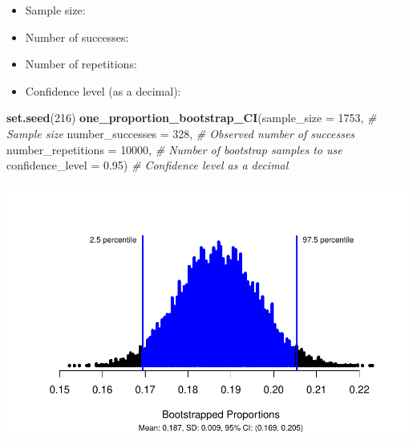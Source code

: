 \documentclass[
]{report}
\newenvironment{Shaded}{\begin{snugshade}}{\end{snugshade}}
\newcommand{\AttributeTok}[1]{\textcolor[rgb]{0.13,0.29,0.53}{#1}}
\newcommand{\CommentTok}[1]{\textcolor[rgb]{0.56,0.35,0.01}{\textit{#1}}}
\newcommand{\DecValTok}[1]{\textcolor[rgb]{0.00,0.00,0.81}{#1}}
\newcommand{\FloatTok}[1]{\textcolor[rgb]{0.00,0.00,0.81}{#1}}
\newcommand{\FunctionTok}[1]{\textcolor[rgb]{0.13,0.29,0.53}{\textbf{#1}}}
\newcommand{\NormalTok}[1]{#1}
\providecommand{\tightlist}{%
  \setlength{\itemsep}{0pt}\setlength{\parskip}{0pt}}
\begin{document}
\begin{itemize}
\tightlist
\item
  Sample size:
\end{itemize}

\vspace{.1in}

\begin{itemize}
\tightlist
\item
  Number of successes:
\end{itemize}

\vspace{.1in}

\begin{itemize}
\tightlist
\item
  Number of repetitions:
\end{itemize}

\vspace{.1in}

\begin{itemize}
\tightlist
\item
  Confidence level (as a decimal):
\end{itemize}

\vspace{.1in}

\begin{Shaded}
\begin{Highlighting}[]
\FunctionTok{set.seed}\NormalTok{(}\DecValTok{216}\NormalTok{)}
\FunctionTok{one\_proportion\_bootstrap\_CI}\NormalTok{(}\AttributeTok{sample\_size =} \DecValTok{1753}\NormalTok{, }\CommentTok{\# Sample size}
                    \AttributeTok{number\_successes =} \DecValTok{328}\NormalTok{, }\CommentTok{\# Observed number of successes}
                    \AttributeTok{number\_repetitions =} \DecValTok{10000}\NormalTok{, }\CommentTok{\# Number of bootstrap samples to use}
                    \AttributeTok{confidence\_level =} \FloatTok{0.95}\NormalTok{) }\CommentTok{\# Confidence level as a decimal}
\end{Highlighting}
\end{Shaded}

\begin{center}\includegraphics[width=0.7\linewidth]{05-UR-module3_review_files/figure-latex/unnamed-chunk-4-1} \end{center}
\end{document}
